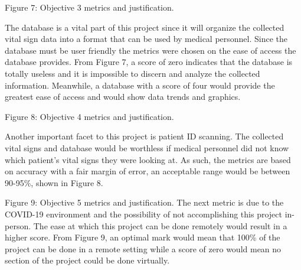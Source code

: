 ﻿\documentclass[10pt]{article}
\begin{document}
Figure 7: Objective 3 metrics and justification.


The database is a vital part of this project since it will organize the collected vital sign data into a format that can be used by medical personnel. Since the database must be user friendly the metrics were chosen on the ease of access the database provides. From Figure 7, a score of zero indicates that the database is totally useless and it is impossible to discern and analyze the collected information. Meanwhile, a database with a score of four would provide the greatest ease of access and would show data trends and graphics. 




%
%
%
%
%
%
%	

Figure 8: Objective 4 metrics and justification.


Another important facet to this project is patient ID scanning. The collected vital signs and database would be worthless if medical personnel did not know which patient’s vital signs they were looking at. As such, the metrics are based on accuracy with a fair margin of error, an acceptable range would be between 90-95\%, shown in Figure 8. 

%
%	

Figure 9: Objective 5 metrics and justification.
The next metric is due to the COVID-19 environment and the possibility of not accomplishing this project in-person. The ease at which this project can be done remotely would result in a higher score. From Figure 9, an optimal mark would mean that 100\% of the project can be done in a remote setting while a score of zero would mean no section of the project could be done virtually. 
\end{document}
